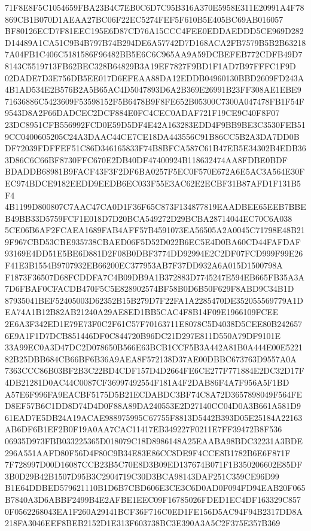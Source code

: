 \documentclass[UTF8,fontset=fandol,zihao=-4,a4paper]{ctexart}
\begin{document}
{{71F8E8F5C1054659FBA23B4C7EB0C6D7C95B316A370E5958E311E20991A4F78869CB1B070D1AEAA27BC06F22EC5274FEF5F610B5E405BC69AB016057
BF80126ECD7F81EEC195E6D87CD76A15CCC4FEE0EDDAEDDD5CE969D282D14489A1CA51C9B4B797B74B294DE6A57742D7D168ACA2FB7579B5B2B63218
7A04FB1C406C5181586F96482BB5E6C6C965AA9A59DCBEFEB772CDFB49D78143C5519713FB62BEC328B64829B3A19EF7827F9BD1F1AD7B97FFFC1F9D
02DADE7D3E756DB5EE017D6EFEAA88DA12EDDB04960130BBD2609FD243A4B1AD534E2B576B2A5B65AC4D5047893D6A2B369E26991B23FF308AE1EBE9
71636886C5423609F53598152F5B6478B9F8FE652B05300C7300A047478FB1F54F9543D8A2F66DADCEC2DCF884E0FC4CEC0ADAF721F19CE9C40F8F07
23DC8951CFB556992FCD0E59D5DF4E42A163283EDD4F9BB9BE3C3530FEB519CC0400605205C24A3DAAC44CE7CE18DA443556C91B86CC5B2A3DA7DD0B
DF72039FDFFEF51C86D346165833F74B8BFCA587C61B47EB5E34302B4EDB363D86C6C66BF8730FFC670E2DB40DF47400924B118632474AA8FDBE0BDF
BDADDB68981B9FACF43F3F2DF6BA0257F5EC0F570E672A6E5AC3A564E30FEC974BDCE9182EEDD9EEDB6EC033F55E3AC62E2ECBF31B87AFD1F131B5F4
4B1199D800807C7AAC47CA0D1F36F65C873F134877819EAADBEE65EEB7BBEB49BB33D5759FCF1E018D7D20BCA549272D29BCBA28714044EC70C6A038
5CE06B6AF2FCAEA1689FAB4AFF57B4591073EA56505A2A0045C71798E48B219F967CBD53CBE935738CBAED06F5D52D022B6EC5E4D0BA60CD44FAFDAF
93169E4DD51E5BE6D881D2F08B0DBF3774DD92994E2C2DF07FCD999F99E26F41E3B1554B9707932EB66200EC377953AB7F37DD932A6A015D1500798A
F1873F36507D68FCDDFA7C4B09DB9A1B372883D7745247E594EB665FB35A3A7D6FBAF0CFACDB470F5C5E828902574BF58B0D6B50F629F8ABD9C34B1D
87935041BEF52405003D62352B15B279D7F22FA1A2285470DE352055569779A1DEA74A1B12B82AB21240A29AE8ED1BB5CAC4F8B14F09E1966109FCEE
2E6A3F342ED1E79E73F0C2F61C57F70163711E8078C5D4038D5CEE80B2426576E9A1F1D7DCB851446DF0C844720B96DC21D297E811D550A79DF9101E
33A99EC0A3D47DC2D078650B566E63BCB1CCF5B3A442A81B0A444E00E522182B25DBB684CB66BF6B36A9AEA8F572138D37AE00DBBC673763D9557A0A
7363CCC86B03BF2B3C22BD4CDF157D4D2664FE6CE277F771884E2DC32D17F4DB21281D0AC44C0087CF36997492554F181A4F2DAB86F4A7F956A5F1BD
A57E6F996FA9EACBF5175D5B21ECDABDC3BF74C8A72D3657898049F564FED8EF57B6C1DD8D74D4D0F88A89DA240553E2D27140CC04D0A3B661A581D9
61EAD7E5DB24A19ACAE988975995C67755F8813D5442B393D05E25184A22163AB6DF6B1EF2B0F19A0AA7CAC11417EB349227F0211E7FF39472B8F536
06935D973FBB033225365D018079C18D8986148A25EAABA98BDC32231A3BDE296A551AAFD80F56D4F80C9B34E83E86CC8DE9F4CCE8B1782B6E6F871F
7F728997D00D16087CCB23B5C70E8D3B09ED137674B071F1B350206602E85DF3B0D29B42B1507D95B3C2904719C30D3BCA98143DAF251C359CE96D99
B1E64DDBED579621110B1D6B7CBD606E3CE3C6D0AD0F094FD94EAB20F065B7840A3D6ABBF2499B4E2AFBE1EEC09F16785026FDED1EC4DF163329C857
0F0562268043EA1F260A29141BCF36F716C0ED1FE156D5AC94F94B2317DD8A218FA3046EEF8BEB2152D1E313F603738BC3E390A3A5C2F375E357B369
}}
\end{document}
